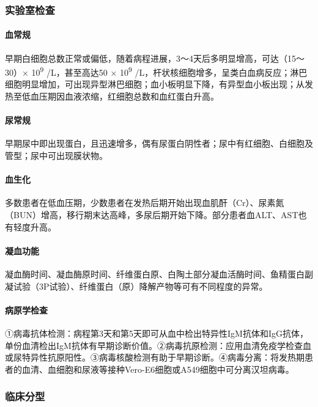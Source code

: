 \subsubsection{实验室检查}

\paragraph{血常规}

早期白细胞总数正常或偏低，随着病程进展，3～4天后多明显增高，可达（15～30）×
10\textsuperscript{9} /L，甚至高达50 × 10\textsuperscript{9}
/L，杆状核细胞增多，呈类白血病反应；淋巴细胞明显增加，可出现异型淋巴细胞；血小板明显下降，有异型血小板出现；从发热至低血压期因血液浓缩，红细胞总数和血红蛋白升高。

\paragraph{尿常规}

早期尿中即出现蛋白，且迅速增多，偶有尿蛋白阴性者；尿中有红细胞、白细胞及管型；尿中可出现膜状物。

\paragraph{血生化}

多数患者在低血压期，少数患者在发热后期开始出现血肌酐（Cr）、尿素氮（BUN）增高，移行期末达高峰，多尿后期开始下降。部分患者血ALT、AST也有轻度升高。

\paragraph{凝血功能}

凝血酶时间、凝血酶原时间、纤维蛋白原、白陶土部分凝血活酶时间、鱼精蛋白副凝试验（3P试验）、纤维蛋白（原）降解产物等可有不同程度的异常。

\paragraph{病原学检查}

①病毒抗体检测：病程第3天和第5天即可从血中检出特异性IgM抗体和IgG抗体，单份血清检出IgM抗体有早期诊断价值。②病毒抗原检测：应用血清免疫学检查血或尿特异性抗原阳性。③病毒核酸检测有助于早期诊断。④病毒分离：将发热期患者的血清、血细胞和尿液等接种Vero-E6细胞或A549细胞中可分离汉坦病毒。

\subsubsection{临床分型}

